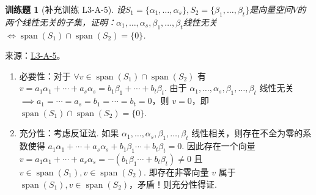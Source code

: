 \documentclass[12pt,fontset=fandol]{ctexart}
\newtheorem{exercise}{训练题}[section]
\begin{document}
\begin{exercise}[补充训练 L3-A-5]\label{prob:L3-A-5}
设$S_1=\{\alpha_1,\ldots,\alpha_s\},S_2=\{\beta_1,\ldots,\beta_t\}$是向量空间$V$的两个线性无关的子集，证明：$\alpha_1,\ldots,\alpha_s,\beta_1,\ldots,\beta_t$线性无关$\iff \operatorname{span}(S_1)\cap \operatorname{span}(S_2)=\{0\}$.
\end{exercise}
\noindent 来源：\href{https://github.com/yhwu-is/Linear-Algebra-Left-Undone/blob/new/%E8%AE%B2%E4%B9%89/%E4%B8%93%E9%A2%98/3%20%E6%9C%89%E9%99%90%E7%BB%B4%E7%BA%BF%E6%80%A7%E7%A9%BA%E9%97%B4.tex}{L3-A-5}。
\begin{solve}
\begin{enumerate}
                \item 必要性：对于 $\forall v\in\operatorname{span}(S_1) \cap \operatorname{span}(S_2)$ 有 $v=a_1\alpha_1+\cdots+a_s\alpha_s=b_1\beta_1+\cdots+b_t\beta_t$. 由于 $\alpha_1,\ldots,\alpha_s,\beta_1,\ldots,\beta_t$ 线性无关 $\implies a_1=\cdots=a_s=b_1=\cdots=b_t=0$，则 $v=0$，即 $\operatorname{span}(S_1)\cap\operatorname{span}(S_2)=\{0\}$.

                \item 充分性：考虑反证法. 如果 $\alpha_1,\ldots,\alpha_s,\beta_1,\ldots,\beta_t$ 线性相关，则存在不全为零的系数使得 $a_1\alpha_1+\cdots+a_s\alpha_s+b_1\beta_1\cdots+b_t\beta_t=0$. 因此存在一个向量 $v=a_1\alpha_1+\cdots+a_s\alpha_s=-(b_1\beta_1\cdots+b_t\beta_t)\neq 0$ 且 $v\in\operatorname{span}(S_1),v\in\operatorname{span}(S_2)$. 即存在非零向量 $v$ 属于 $\operatorname{span}(S_1),v\in\operatorname{span}(S_2)$，矛盾！则充分性得证.
            \end{enumerate}
\end{solve}
\end{document}
